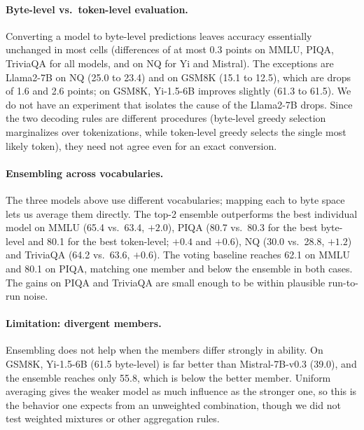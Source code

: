 \documentclass{article} %
\begin{document}
\paragraph{Byte-level vs.\ token-level evaluation.}
Converting a model to byte-level predictions leaves accuracy essentially unchanged in most cells (differences of at most 0.3 points on MMLU, PIQA, TriviaQA for all models, and on NQ for Yi and Mistral). The exceptions are Llama2-7B on NQ (25.0 to 23.4) and on GSM8K (15.1 to 12.5), which are drops of 1.6 and 2.6 points; on GSM8K, Yi-1.5-6B improves slightly (61.3 to 61.5). We do not have an experiment that isolates the cause of the Llama2-7B drops. Since the two decoding rules are different procedures (byte-level greedy selection marginalizes over tokenizations, while token-level greedy selects the single most likely token), they need not agree even for an exact conversion.

\paragraph{Ensembling across vocabularies.}
The three models above use different vocabularies; mapping each to byte space lets us average them directly. The top-2 ensemble outperforms the best individual model on MMLU (65.4 vs.\ 63.4, $+2.0$), PIQA (80.7 vs.\ 80.3 for the best byte-level and 80.1 for the best token-level; $+0.4$ and $+0.6$), NQ (30.0 vs.\ 28.8, $+1.2$) and TriviaQA (64.2 vs.\ 63.6, $+0.6$). The voting baseline reaches 62.1 on MMLU and 80.1 on PIQA, matching one member and below the ensemble in both cases. The gains on PIQA and TriviaQA are small enough to be within plausible run-to-run noise.

\paragraph{Limitation: divergent members.}
Ensembling does not help when the members differ strongly in ability. On GSM8K, Yi-1.5-6B (61.5 byte-level) is far better than Mistral-7B-v0.3 (39.0), and the ensemble reaches only 55.8, which is below the better member. Uniform averaging gives the weaker model as much influence as the stronger one, so this is the behavior one expects from an unweighted combination, though we did not test weighted mixtures or other aggregation rules.
\end{document}
